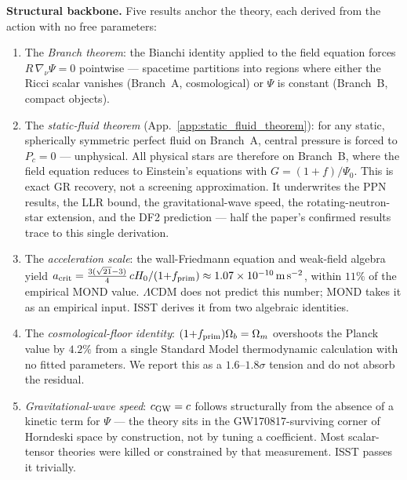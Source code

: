 \documentclass[aps,prd,twocolumn,nofootinbib,floatfix,superscriptaddress]{revtex4-2}
\newcommand{\fprim}{f_{\rm prim}}
\begin{document}
\textbf{Structural backbone.} Five results anchor the theory, each
derived from the action with no free parameters:
\begin{enumerate}
\item The \emph{Branch theorem}: the Bianchi identity applied to
the field equation forces $R\,\nabla_\nu\Psi = 0$ pointwise ---
spacetime partitions into regions where either the Ricci scalar
vanishes (Branch~A, cosmological) or $\Psi$ is constant (Branch~B,
compact objects).

\item The \emph{static-fluid theorem}
(App.~\ref{app:static_fluid_theorem}): for any static, spherically
symmetric perfect fluid on Branch~A, central pressure is forced to
$P_c = 0$ --- unphysical. All physical stars are therefore on
Branch~B, where the field equation reduces to Einstein's equations
with $G = (1{+}f)/\Psi_0$. This is exact GR recovery, not a
screening approximation. It underwrites the PPN results, the LLR
bound, the gravitational-wave speed, the rotating-neutron-star
extension, and the DF2 prediction --- half the paper's confirmed
results trace to this single derivation.

\item The \emph{acceleration scale}: the wall-Friedmann equation
and weak-field algebra yield
$a_{\rm crit} = \tfrac{3(\sqrt{21}-3)}{4}\,cH_0/(1{+}\fprim)
\approx 1.07\times 10^{-10}\,{\rm m\,s^{-2}}$, within $11\%$ of
the empirical MOND value. $\Lambda$CDM does not predict this
number; MOND takes it as an empirical input. ISST derives it from
two algebraic identities.

\item The \emph{cosmological-floor identity}:
$(1{+}\fprim)\Omega_b = \Omega_m$ overshoots the Planck value by
$4.2\%$ from a single Standard Model thermodynamic calculation
with no fitted parameters. We report this as a $1.6$--$1.8\sigma$
tension and do not absorb the residual.

\item \emph{Gravitational-wave speed}: $c_{\rm GW} = c$ follows
structurally from the absence of a kinetic term for $\Psi$ ---
the theory sits in the GW170817-surviving corner of Horndeski
space by construction, not by tuning a coefficient. Most
scalar-tensor theories were killed or constrained by that
measurement. ISST passes it trivially.
\end{enumerate}
\end{document}
